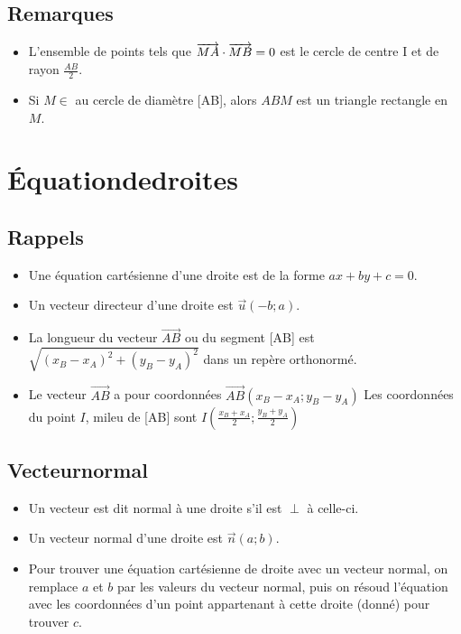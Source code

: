 \documentclass[a4paper,twoside,10pt,french,twocolumn]{scrartcl}
\begin{document}
\subsection{Remarques}
\begin{itemize}
 \item L'ensemble de points tels que $\protect\overrightarrow{MA} \cdot \protect\overrightarrow{MB} = 0$ est le cercle de centre I et de rayon $\frac{AB}{2}$.
 \item Si $M \in $ au cercle de diamètre [AB], alors $ABM$ est un triangle rectangle en $M$.
\end{itemize}
\section{Équation\:de\:droites}
\subsection{Rappels}
\begin{itemize}
 \item Une équation cartésienne d'une droite est de la forme $ax+by+c = 0$.
 \item Un vecteur directeur d'une droite est $\overrightarrow{u}(-b ; a)$.
  \item La longueur du vecteur $\overrightarrow{AB}$ ou du segment [AB] est $\sqrt{(x_B-x_A)^2+(y_B-y_A)^2}$ dans un repère orthonormé.
  \item Le vecteur $\overrightarrow{AB}$ a pour coordonnées $\overrightarrow{AB}(x_B-x_A ; y_B-y_A)$
  Les coordonnées du point $I$, mileu de [AB] sont $I(\frac{x_B+x_A}{2} ; \frac{y_B+y_A}{2})$
\end{itemize}
\subsection{Vecteur\:normal}
\begin{itemize}
\item Un vecteur est dit normal à une droite s'il est $\perp $ à celle-ci.
\item Un vecteur normal d'une droite est $\overrightarrow{n}(a ; b)$.
\item Pour trouver une équation cartésienne de droite avec un vecteur normal, on remplace $a$ et $b$ par les valeurs du vecteur normal, puis on résoud l'équation avec les coordonnées d'un point appartenant à cette droite (donné) pour trouver $c$.
\end{itemize}
\end{document}
